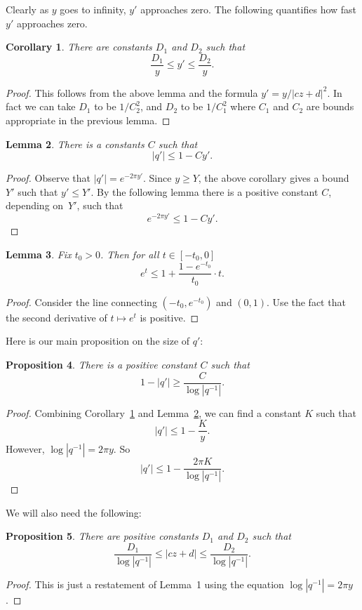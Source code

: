 \documentclass {amsart}
\theoremstyle{plain}
\newtheorem{proposition}{Proposition}
\newtheorem{corollary}[proposition]{Corollary}
\newtheorem{lemma}[proposition]{Lemma}
\theoremstyle{definition}
\theoremstyle{remark}
\begin{document}
Clearly as $y$ goes to infinity, $y'$ approaches zero. The following quantifies how fast $y'$ approaches zero.

\begin{corollary}\label{c2}
There are constants $D_1$ and $D_2$ such that
$$
\frac{D_1}{y} \le y' \le \frac{D_2}{y}.
$$
\end{corollary}

\begin{proof}
This follows from the above lemma and the formula $y' = y / |c z + d|^2$.
In fact we can take $D_1$ to be $1/C^{2}_2$, and $D_2$ to be $1/C^2_1$
where $C_1$ and $C_2$ are bounds appropriate in the previous lemma.
\end{proof}

\begin{lemma}\label{l3}
There is a  constants $C$  such that
$$
|q'| \le 1 - C y'.
$$
\end{lemma}

\begin{proof}
Observe that $|q'| = e^{-2\pi y'}$. 
Since $y \ge Y$, the above corollary gives a bound $Y'$ such that $y' \le Y'$.
By the following lemma there is a positive constant $C$, depending on~$Y'$, such that
$$
e^{-2 \pi y'} \le 1 - C y'.
$$
\end{proof}

\begin{lemma}
Fix $t_0>0$. Then
for all $t \in [-t_0, 0]$
$$
e^t \le 1 + \frac{1 - e^{-t_0}}{t_0} \cdot t.
$$
\end{lemma}
\begin{proof}
Consider the line
connecting  $(-t_0, e^{-t_0})$ and $(0, 1)$.
Use the fact that the second derivative of $t \mapsto e^t$ is positive. 
\end{proof}

Here is our main proposition on the size of $q'$:

\begin{proposition}
There is a positive constant $C$ such that
$$
1 - \left| q' \right| \ge \frac{C}{\log \left|q^{-1}\right| }.
$$
\end{proposition}

\begin{proof}
Combining Corollary~\ref{c2} and Lemma~\ref{l3}, we can find a constant $K$ such that
$$
|q'| \le 1 -  \frac{K}{y}.
$$
However, $\log \left|q^{-1}\right| = 2 \pi y$.
So 
$$
|q'| \le 1 -  \frac{2 \pi K}{\log \left|q^{-1}\right| }.
$$
\end{proof}

We will also need the following:

\begin{proposition}
There are positive constants $D_1$ and $D_2$ such that
$$
 \frac{D_1}{\log \left|q^{-1}\right| } \le |c z + d| \le \frac{D_2}{\log \left|q^{-1}\right| }.
$$
\end{proposition}

\begin{proof}
This is just a restatement of Lemma~1 using the equation 
$\log \left|q^{-1}\right| = 2 \pi y$.
\end{proof}
\end{document}
